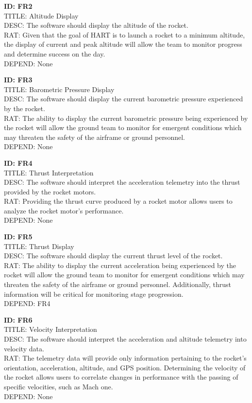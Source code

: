 \documentclass[onecolumn, draftclsnofoot,10pt, compsoc]{IEEEtran}
\begin{document}
			\noindent
			\textbf{ID: FR2}\\
			TITLE: Altitude Display\\
			DESC: The software should display the altitude of the rocket.\\
			RAT: Given that the goal of HART is to launch a rocket to a minimum altitude, the display of current and peak altitude will allow the team to monitor progress and determine success on the day.\\
			DEPEND: None\
			
			\noindent
			\textbf{ID: FR3}\\
			TITLE: Barometric Pressure Display\\
			DESC: The software should display the current barometric pressure experienced by the rocket.\\
			RAT: The ability to display the current barometric pressure being experienced by the rocket will allow the ground team to monitor for emergent conditions which may threaten the safety of the airframe or ground personnel.\\
			DEPEND: None
			
			\noindent
			\textbf{ID: FR4}\\
			TITLE: Thrust Interpretation\\
			DESC: The software should interpret the acceleration telemetry into the thrust provided by the rocket motors.\\
			RAT: Providing the thrust curve produced by a rocket motor allows users to analyze the rocket motor's performance.\\
			DEPEND: None
			
			\noindent
			\textbf{ID: FR5}\\
			TITLE: Thrust Display\\
			DESC: The software should display the current thrust level of the rocket.\\
			RAT: The ability to display the current acceleration being experienced by the rocket will allow the ground team to monitor for emergent conditions which may threaten the safety of the airframe or ground personnel.
				Additionally, thrust information will be critical for monitoring stage progression.\\
			DEPEND: FR4
			
			\noindent
			\textbf{ID: FR6}\\
			TITLE: Velocity Interpretation\\
			DESC: The software should interpret the acceleration and altitude telemetry into velocity data.\\
			RAT: The telemetry data will provide only information pertaining to the rocket's orientation, acceleration, altitude, and GPS position.
				Determining the velocity of the rocket allows users to correlate changes in performance with the passing of specific velocities, such as Mach one.\\
			DEPEND: None
			
\end{document}
